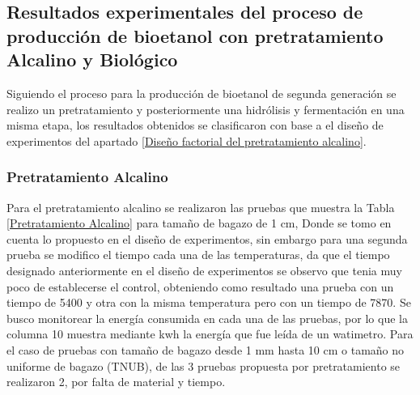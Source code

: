 \documentclass[12pt]{article}
\begin{document}
	     	
	     	
	     	
			
			
			\newpage

				\subsection{Resultados experimentales del proceso de producción de bioetanol con pretratamiento Alcalino  y Biológico}
				Siguiendo el proceso para la producción de bioetanol de segunda generación se realizo un pretratamiento y posteriormente una hidrólisis y fermentación en una misma etapa, los resultados obtenidos se clasificaron con base a el diseño de experimentos del apartado \ref{Diseño factorial del pretratamiento alcalino}.
				
				
				
				\subsubsection{Pretratamiento Alcalino}
				
				
	Para el pretratamiento alcalino se realizaron las pruebas que muestra la Tabla \ref{Pretratamiento Alcalino} para tamaño de bagazo de 1 cm, Donde se tomo en cuenta lo propuesto en el diseño de experimentos, sin embargo para una segunda prueba se modifico el tiempo cada una de las temperaturas, da que el tiempo designado anteriormente en el diseño de experimentos se observo que tenia muy poco de establecerse el control, obteniendo como resultado una prueba con un tiempo de 5400 y otra con la misma temperatura pero con un tiempo de 7870. 
	Se busco monitorear la energía consumida en cada una de las pruebas, por lo que la columna 10 muestra mediante kwh la energía que fue leída de un watimetro.
	Para el caso de pruebas con tamaño de bagazo desde 1 mm hasta 10 cm o tamaño no uniforme de bagazo (TNUB), de las 3 pruebas propuesta por pretratamiento se realizaron 2, por falta de material y tiempo. 	
	
\end{document}
